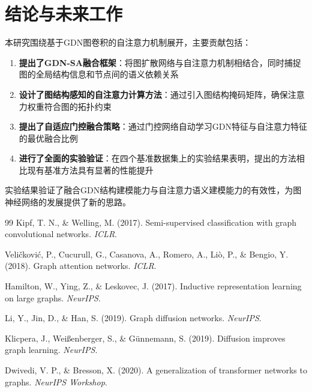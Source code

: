 \documentclass{beamer}
\makeatletter
\providecommand{\framesettitle}[1]{%
  \beamer@frametitle{#1}%
}
\makeatother
\begin{document}
\section{结论与未来工作}

\begin{frame}
  \framesettitle{研究总结}

  本研究围绕基于GDN图卷积的自注意力机制展开，主要贡献包括：

  \vspace{0.3cm}

  \begin{enumerate}
    \item \textbf{提出了GDN-SA融合框架}：将图扩散网络与自注意力机制相结合，同时捕捉图的全局结构信息和节点间的语义依赖关系

    \item \textbf{设计了图结构感知的自注意力计算方法}：通过引入图结构掩码矩阵，确保注意力权重符合图的拓扑约束

    \item \textbf{提出了自适应门控融合策略}：通过门控网络自动学习GDN特征与自注意力特征的最优融合比例

    \item \textbf{进行了全面的实验验证}：在四个基准数据集上的实验结果表明，提出的方法相比现有基准方法具有显著的性能提升
  \end{enumerate}

  \vspace{0.3cm}

  实验结果验证了融合GDN结构建模能力与自注意力语义建模能力的有效性，为图神经网络的发展提供了新的思路。
\end{frame}

\begin{frame}
  \framesettitle{参考文献}

  \begin{thebibliography}{99}
    Kipf, T. N., \& Welling, M. (2017). Semi-supervised classification with graph convolutional networks. \textit{ICLR}.

    Veličković, P., Cucurull, G., Casanova, A., Romero, A., Liò, P., \& Bengio, Y. (2018). Graph attention networks. \textit{ICLR}.

    Hamilton, W., Ying, Z., \& Leskovec, J. (2017). Inductive representation learning on large graphs. \textit{NeurIPS}.

    Li, Y., Jin, D., \& Han, S. (2019). Graph diffusion networks. \textit{NeurIPS}.

    Klicpera, J., Weißenberger, S., \& Günnemann, S. (2019). Diffusion improves graph learning. \textit{NeurIPS}.

    Dwivedi, V. P., \& Bresson, X. (2020). A generalization of transformer networks to graphs. \textit{NeurIPS Workshop}.
  \end{thebibliography}
\end{frame}
\end{document}
